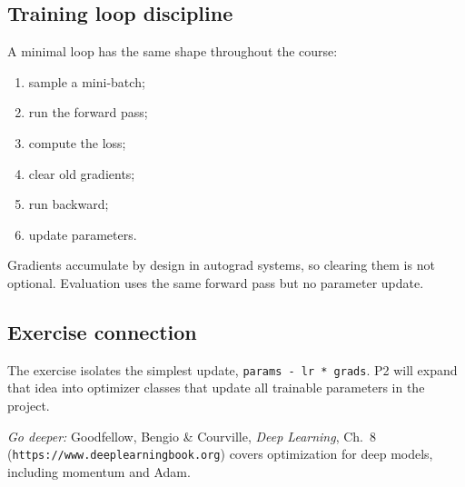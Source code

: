 \subsection*{Training loop discipline}
A minimal loop has the same shape throughout the course:
\begin{enumerate}
  \item sample a mini-batch;
  \item run the forward pass;
  \item compute the loss;
  \item clear old gradients;
  \item run backward;
  \item update parameters.
\end{enumerate}
Gradients accumulate by design in autograd systems, so clearing them is not
optional. Evaluation uses the same forward pass but no parameter update.

\subsection*{Exercise connection}
The exercise isolates the simplest update, \texttt{params - lr * grads}. P2
will expand that idea into optimizer classes that update all trainable
parameters in the project.

\medskip
\noindent\textit{Go deeper:} Goodfellow, Bengio \& Courville, \emph{Deep
Learning}, Ch.~8 (\texttt{https://www.deeplearningbook.org}) covers optimization
for deep models, including momentum and Adam.
